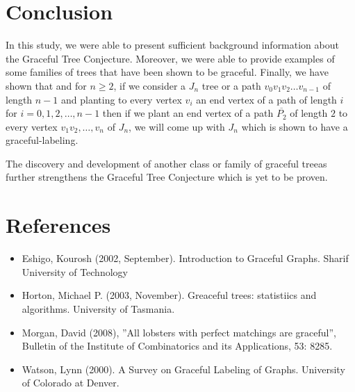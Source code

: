 \documentclass[a4paper, 11pt]{article}
\begin{document}
\section{Conclusion}

In this study, we were able to present sufficient background information about the Graceful Tree Conjecture. Moreover, we were able to provide examples of some families of trees that have been shown to be graceful. Finally, we have shown that and for $n\geq2$, if we consider a $J_{n}$ tree or a path $v_{0}v_{1}v_{2}\ldots v_{n-1}$ of length $n−1$ and planting to every vertex $v_{i}$ an end vertex of a path of length $i$ for
$i = 0,1,2,\ldots,n−1$ then if we plant an end vertex of a path $\overline{P_{2}}$ of length $2$ to every vertex $v_{1}v_{2},\ldots,v_{n}$ of $J_{n}$, we will come up with $J_{n}$ which is shown to have a graceful-labeling. 

The discovery and development of another class or family of graceful treeas further strengthens the Graceful Tree Conjecture which is yet to be proven.


\section{References}
\begin{itemize}
	\item Eshigo, Kourosh (2002, September). Introduction to Graceful Graphs. Sharif University of Technology
	\item Horton, Michael P. (2003, November). Greaceful trees: statistiics and algorithms. University of Tasmania.
	\item Morgan, David (2008), ”All lobsters with perfect matchings are graceful”, Bulletin of the Institute of Combinatorics and its Applications, 53: 8285.
	\item Watson, Lynn (2000). A Survey on Graceful Labeling of Graphs. University of Colorado at Denver.
\end{itemize}
\end{document}
